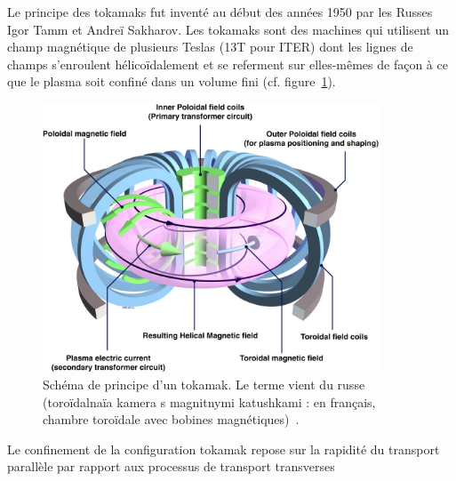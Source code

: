 \begin{refsection}
Le principe des tokamaks fut inventé au début des années 1950 par les Russes Igor Tamm et
Andreï Sakharov. Les tokamaks sont des machines qui utilisent
un champ magnétique de plusieurs Teslas (13T pour ITER) dont les lignes de
champs s'enroulent hélicoïdalement et se referment sur elles-mêmes de façon à ce que le plasma soit
confiné dans un volume fini (cf. figure~\ref{tokamak}).
\begin{figure}[!htbp]
    \centering
	\includegraphics[height=80mm]{figures/1-tokamak.jpg}
	\caption{Schéma de principe d'un tokamak. Le terme vient du
russe (toroïdalnaïa kamera s magnitnymi katushkami : en français, chambre toroïdale avec bobines
magnétiques)~\parencite{efda}.}\label{tokamak}
\end{figure}

Le confinement de la configuration tokamak repose sur la rapidité du transport
parallèle par rapport aux processus de transport transverses
\end{refsection}
